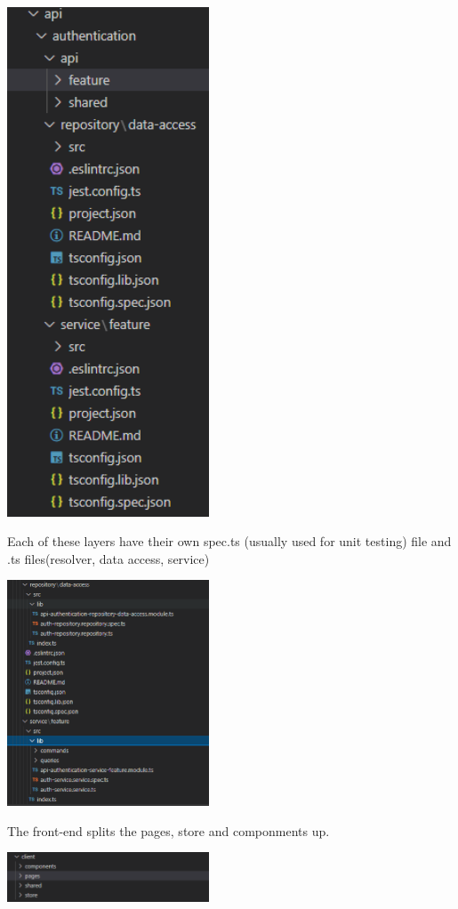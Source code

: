 \documentclass[hidelinks, 12pt, a4paper]{article}
\begin{document}
\begin{center}
    \includegraphics[width=6cm]{images/File Structure 3.png} \\
\end{center}
\vspace{0.5cm} 
Each of these layers have their own spec.ts (usually used for unit testing) file and .ts files(resolver, data access, service)
\begin{center}
    \includegraphics[width=6cm]{images/File Structure 5.png} \\
\end{center}
\vspace{0.5cm} 
The front-end splits the pages, store and componments up.
\begin{center}
    \includegraphics[width=6cm]{images/File Structure 6.png} \\
\end{center}
\vspace{0.5cm} 
\end{document}
